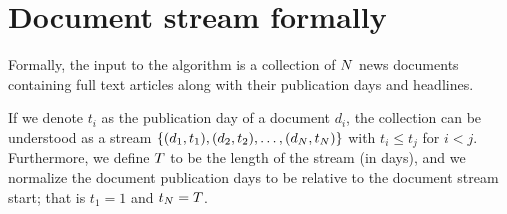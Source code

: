 \section{Document stream formally}
Formally, the input to the algorithm is a collection of $N$ news documents containing full text articles along with their publication days and headlines.

If we denote $t_{i}$ as the publication day of a document $d_{i}$, the collection can be understood as a stream $\left\{ (d_{1}, t_{1}), (d_{2}, t_{2}), \dots, (d_{N}, t_{N}) \right\}$ with $t_{i} \leq t_{j}$ for $i < j$. Furthermore, we define $T$ to be the length of the stream (in days), and we normalize the document publication days to be relative to the document stream start; that is $t_{1} = 1$ and $t_{N} = T$.